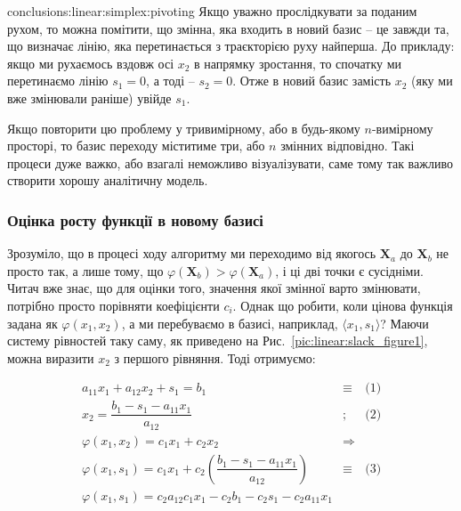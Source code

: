 \documentclass[\main/book.tex]{subfiles}
\begin{document}
\begin{conclusions}{conclusions:linear:simplex:pivoting}
 Якщо уважно прослідкувати за поданим рухом, то можна помітити, що змінна, яка входить в новий базис -- це завжди та, що визначає лінію, яка перетинається з траєкторією руху найперша. До прикладу: якщо ми рухаємось вздовж осі $x_2$ в напрямку зростання, то спочатку ми перетинаємо лінію $s_1 = 0$, а тоді -- $s_2 = 0$. Отже в новий базис замість $x_2$ (яку ми вже змінювали раніше) увійде $s_1$.
\end{conclusions}

Якщо повторити цю проблему у тривимірному, або в будь-якому $n$-вимірному просторі, то базис переходу міститиме три, або $n$ змінних відповідно. Такі процеси дуже важко, або взагалі неможливо візуалізувати, саме тому так важливо створити хорошу аналітичну модель.

\subsubsection{Оцінка росту функції в новому базисі}

Зрозуміло, що в процесі ходу алгоритму ми переходимо від якогось $\mathbf{X}_a$ до $\mathbf{X}_b$ не просто так, а лише тому, що $\varphi(\mathbf{X}_b) > \varphi(\mathbf{X}_a)$, і ці дві точки є сусідніми. Читач вже знає, що для оцінки того, значення якої змінної варто змінювати, потрібно просто порівняти коефіцієнти $c_i$. Однак що робити, коли цінова функція задана як $\varphi(x_1, x_2)$, а ми перебуваємо в базисі, наприклад, $\langle x_1, s_1 \rangle$? Маючи систему рівностей таку саму, як приведено на Рис.~\ref{pic:linear:slack_figure1}, можна виразити $x_2$ з першого рівняння. Тоді отримуємо:

\begin{equation}
 \begin{array}{lcc}
  a_{11} x_1 + a_{12} x_2 + s_1 = b_1          & \equiv      & \text{(1)} \\ [8pt]
  x_2 = \dfrac{b_1 - s_1 - a_{11} x_1}{a_{12}} & \text{;}    & \text{(2)} \\ [8pt]
  \varphi(x_1, x_2) = c_1 x_1 + c_2 x_2        & \Rightarrow &            \\ [8pt]
  \varphi(x_1, s_1) = c_1 x_1 + c_2 \left(
    \dfrac{b_1 - s_1 - a_{11} x_1}{a_{12}}
  \right)                                      & \equiv      & \text{(3)} \\ [8pt]
  \varphi(x_1, s_1) =
  c_2 a_{12} c_1 x_1 - c_2 b_1 - c_2 s_1 - c_2 a_{11} x_1  & &
 \end{array}
 \label{eq:linear:simplex:slack_solving}
\end{equation}
\end{document}
